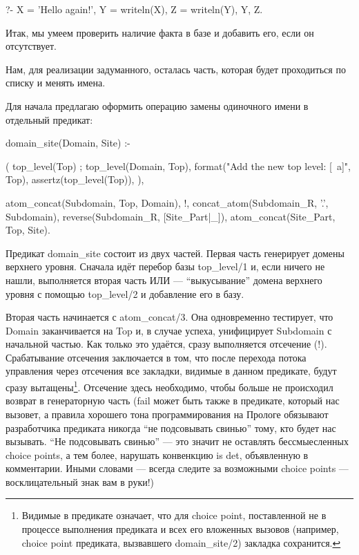 \documentclass[a4paper]{book}
\begin{document}
\begin{example}{}{}
?- X = 'Hello again!',
   Y = writeln(X), Z = writeln(Y), 
   Y, Z.
\end{example}

Итак, мы умеем проверить наличие факта в базе и добавить его,
если он отсутствует.

Нам, для реализации задуманного, осталась часть, которая будет
проходиться по списку и менять имена.

Для начала предлагаю оформить операцию замены одиночного имени в
отдельный предикат:

\begin{example}{}{}
domain_site(Domain, Site) :-

  (
      top_level(Top)
  ;
      top_level(Domain, Top),
      format("Add the new top level: [~a]\n", Top),
      assertz(top_level(Top)),
   ),

   atom_concat(Subdomain, Top, Domain), !,
   concat_atom(Subdomain_R, '.', Subdomain),
   reverse(Subdomain_R, [Site_Part|_]),
   atom_concat(Site_Part, Top, Site).
\end{example}

Предикат domain_site состоит из двух частей. Первая часть
генерирует домены верхнего уровня. Сначала идёт перебор базы
top_level/1 и, если ничего не нашли, выполняется вторая часть ИЛИ
--- ``выкусывание'' домена верхнего уровня с помощью top_level/2
и добавление его в базу.

Вторая часть начинается с atom_concat/3. Она одновременно
тестирует, что Domain заканчивается на Top и, в случае успеха,
унифицирует Subdomain с начальной частью. Как только это удаётся,
сразу выполняется отсечение (!). Срабатывание отсечения
заключается в том, что после перехода потока управления через
отсечения все закладки, видимые в данном предикате, будут сразу
вытащены\footnote{Видимые в предикате означает, что для choice
  point, поставленной не в процессе выполнения предиката и всех
  его вложенных вызовов (например, choice point предиката,
  вызвавшего domain_site/2) закладка сохранится.}. Отсечение
здесь необходимо, чтобы больше не происходил возврат в
генераторную часть (fail может быть также в предикате, который
нас вызовет, а правила хорошего тона программирования на Прологе
обязывают разработчика предиката никогда ``не подсовывать
свинью'' тому, кто будет нас вызывать. ``Не подсовывать свинью''
--- это значит не оставлять бессмыесленных choice points, а тем
более, нарушать конвенкцию is det, объявленную в
комментарии. Иными словами --- всегда следите за возможными
choice points --- восклицательный знак вам в руки!)
\end{document}
